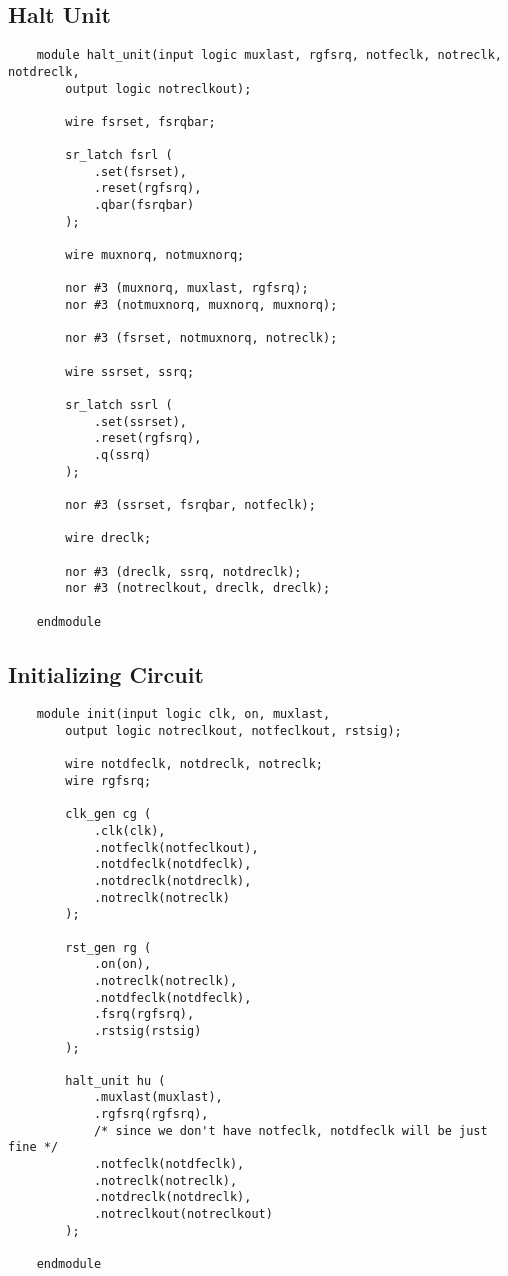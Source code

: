 \documentclass[../main]{subfiles}
\begin{document}
\subsection {Halt Unit}

\begin{verbatim}
    module halt_unit(input logic muxlast, rgfsrq, notfeclk, notreclk, notdreclk,
        output logic notreclkout);

        wire fsrset, fsrqbar;

        sr_latch fsrl (
            .set(fsrset),
            .reset(rgfsrq),
            .qbar(fsrqbar)
        );

        wire muxnorq, notmuxnorq;

        nor #3 (muxnorq, muxlast, rgfsrq);
        nor #3 (notmuxnorq, muxnorq, muxnorq);

        nor #3 (fsrset, notmuxnorq, notreclk);

        wire ssrset, ssrq;

        sr_latch ssrl (
            .set(ssrset),
            .reset(rgfsrq),
            .q(ssrq)
        );

        nor #3 (ssrset, fsrqbar, notfeclk);

        wire dreclk;

        nor #3 (dreclk, ssrq, notdreclk);
        nor #3 (notreclkout, dreclk, dreclk);

    endmodule
\end{verbatim}

\subsection {Initializing Circuit}

\begin{verbatim}
    module init(input logic clk, on, muxlast,
        output logic notreclkout, notfeclkout, rstsig);

        wire notdfeclk, notdreclk, notreclk;
        wire rgfsrq;

        clk_gen cg (
            .clk(clk),
            .notfeclk(notfeclkout),
            .notdfeclk(notdfeclk),
            .notdreclk(notdreclk),
            .notreclk(notreclk)
        );

        rst_gen rg (
            .on(on),
            .notreclk(notreclk),
            .notdfeclk(notdfeclk),
            .fsrq(rgfsrq),
            .rstsig(rstsig)
        );

        halt_unit hu (
            .muxlast(muxlast),
            .rgfsrq(rgfsrq),
            /* since we don't have notfeclk, notdfeclk will be just fine */
            .notfeclk(notdfeclk),
            .notreclk(notreclk),
            .notdreclk(notdreclk),
            .notreclkout(notreclkout)
        );

    endmodule
\end{verbatim}
\end{document}

